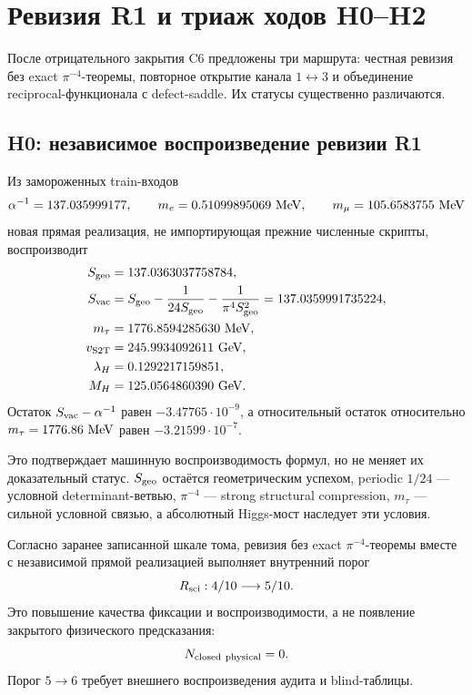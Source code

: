 \chapter{Ревизия R1 и триаж ходов H0--H2}

После отрицательного закрытия C6 предложены три маршрута: честная ревизия
без exact \(\pi^{-4}\)-теоремы, повторное открытие канала
\(1\leftrightarrow3\) и объединение reciprocal-функционала с defect-saddle.
Их статусы существенно различаются.

\section{H0: независимое воспроизведение ревизии R1}

Из замороженных train-входов
\begin{equation}
 \alpha^{-1}=137.035999177,
 \qquad
 m_e=0.51099895069\ {\rm MeV},
 \qquad
 m_\mu=105.6583755\ {\rm MeV}
\end{equation}
новая прямая реализация, не импортирующая прежние численные скрипты,
воспроизводит
\begin{align}
 S_{\rm geo}&=137.0363037758784,\\
 S_{\rm vac}
 &=S_{\rm geo}-\frac1{24S_{\rm geo}}
   -\frac1{\pi^4S_{\rm geo}^2}
 =137.0359991735224,\\
 m_\tau&=1776.8594285630\ {\rm MeV},\\
 v_{\rm S2T}&=245.9934092611\ {\rm GeV},\\
 \lambda_H&=0.1292217159851,\\
 M_H&=125.0564860390\ {\rm GeV}.
\end{align}
Остаток \(S_{\rm vac}-\alpha^{-1}\) равен
\(-3.47765\cdot10^{-9}\), а относительный остаток относительно
\(m_\tau=1776.86\ {\rm MeV}\) равен
\(-3.21599\cdot10^{-7}\).

Это подтверждает машинную воспроизводимость формул, но не меняет их
доказательный статус. \(S_{\rm geo}\) остаётся геометрическим успехом,
periodic \(1/24\) --- условной determinant-ветвью,
\(\pi^{-4}\) --- strong structural compression, \(m_\tau\) --- сильной
условной связью, а абсолютный Higgs-мост наследует эти условия.

\begin{proposition}
Согласно заранее записанной шкале тома, ревизия без exact
\(\pi^{-4}\)-теоремы вместе с независимой прямой реализацией выполняет
внутренний порог
\begin{equation}
 R_{\rm sci}:4/10\longrightarrow5/10.
\end{equation}
Это повышение качества фиксации и воспроизводимости, а не появление
закрытого физического предсказания:
\begin{equation}
 N_{\rm closed\ physical}=0.
\end{equation}
Порог \(5\to6\) требует внешнего воспроизведения аудита и blind-таблицы.
\end{proposition}

